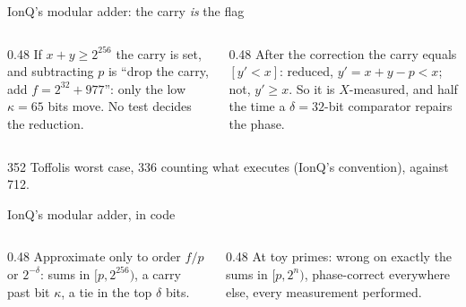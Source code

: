 \documentclass[aspectratio=169,11pt]{beamer}
\newcommand{\code}[2][]{}
\begin{document}
\begin{frame}{IonQ's modular adder: the carry \emph{is} the flag}
  \centering
  \vskip3mm
  \raggedright
  \begin{columns}[T]
    \begin{column}{0.48\textwidth}
      \small If $x+y\ge2^{256}$ the carry is set, and subtracting $p$ is ``drop the carry, add $f=2^{32}+977$'': only the low $\kappa=65$ bits move. No test decides the reduction.
    \end{column}
    \begin{column}{0.48\textwidth}
      \small After the correction the carry equals $[y'<x]$: reduced, $y'=x+y-p<x$; not, $y'\ge x$. So it is $X$-measured, and half the time a $\delta=32$-bit comparator repairs the phase.
    \end{column}
  \end{columns}
  \begin{takeaway}352 Toffolis worst case, 336 counting what executes (IonQ's convention), against 712.\end{takeaway}
\end{frame}

\begin{frame}[fragile]{IonQ's modular adder, in code}
  \code[basicstyle=\ttfamily\fontsize{7.6}{8.8}\selectfont]{modadd_pm_phase.py}
  \begin{columns}[T]
    \begin{column}{0.48\textwidth}
      {\small Approximate only to order $f/p$ or $2^{-\delta}$: sums in $[p,2^{256})$, a carry past bit $\kappa$, a tie in the top $\delta$ bits.}
    \end{column}
    \begin{column}{0.48\textwidth}
      {\small At toy primes: wrong on exactly the sums in $[p,2^n)$, phase-correct everywhere else, every measurement performed.}
    \end{column}
  \end{columns}
\end{frame}
\end{document}

